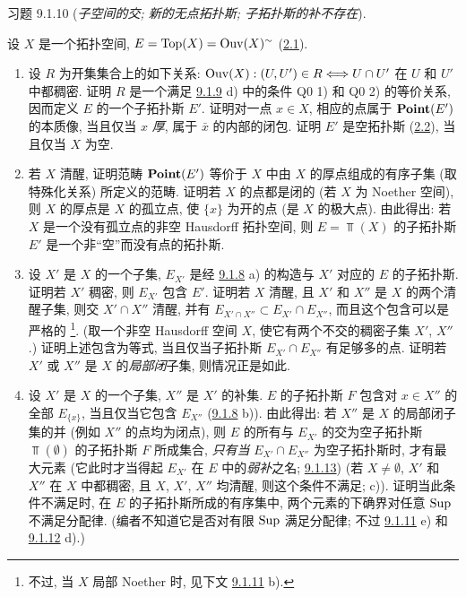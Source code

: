 \begin{enonce*}[remark]{习题 9.1.10}
(\emph{子空间的交; 新的无点拓扑斯; 子拓扑斯的补不存在}).

设 $X$ 是一个拓扑空间,
$E=\operatorname{Top}(X)=\operatorname{Ouv}(X)^{\sim}$ (\hyperref[IV.subsec2.1]{2.1}).

\begin{enumerate}
\renewcommand{\theenumi}{\alph{enumi}}
\renewcommand{\labelenumi}{\theenumi)}
\item 设 $R$ 为开集集合上的如下关系:
$\operatorname{Ouv}(X):(U,U')\in R\Longleftrightarrow U\cap U'$ 在 $U$ 和 $U'$ 中都稠密.
证明 $R$ 是一个满足 \hyperref[IV.exer9.1.9]{9.1.9} d)
中的条件 Q0 1) 和 Q0 2) 的等价关系,
因而定义 $E$ 的一个子拓扑斯 $E'$.
证明对一点 $x\in X$, 相应的点属于 $\operatorname{\mathbf{Point}}(E')$ 的本质像,
当且仅当 $x$ \emph{厚},
\ie 属于 $\bar{x}$ 的内部的闭包.
证明 $E'$ 是空拓扑斯 (\hyperref[IV.subsec2.2]{2.2}), 当且仅当 $X$ 为空.

\item 若 $X$ 清醒,
证明范畴 $\operatorname{\mathbf{Point}}(E')$ 等价于 $X$ 中由 $X$ 的厚点组成的有序子集
(取特殊化关系) 所定义的范畴.
证明若 $X$ 的点都是闭的 (\resp 若 $X$ 为 Noether 空间),
则 $X$ 的厚点是 $X$ 的孤立点,
\ie 使 $\{x\}$ 为开的点 (\resp 是 $X$ 的极大点).
由此得出: 若 $X$ 是\pageoriginale 一个没有孤立点的非空 Hausdorff 拓扑空间,
则 $E=\Top(X)$ 的子拓扑斯 $E'$ 是一个非“空”而没有点的拓扑斯.

\item 设 $X'$ 是 $X$ 的一个子集,
$E_{X'}$ 是经 \hyperref[IV.exer9.1.8]{9.1.8} a)
的构造与 $X'$ 对应的 $E$ 的子拓扑斯.
证明若 $X'$ 稠密, 则 $E_{X'}$ 包含 $E'$.
证明若 $X$ 清醒, 且 $X'$ 和 $X''$ 是 $X$ 的两个清醒子集,
则交 $X'\cap X''$ 清醒,
并有 $E_{X'\cap X''}\subset E_{X'}\cap E_{X''}$,
而且这个包含可以是严格的
\footnote[1]{不过, 当 $X$ 局部 Noether 时, 见下文
\hyperref[IV.exer9.1.11]{9.1.11} b).}.
(取一个非空 Hausdorff 空间 $X$, 使它有两个不交的稠密子集 $X'$, $X''$.)
证明上述包含为等式,
当且仅当子拓扑斯 $E_{X'}\cap E_{X''}$ 有足够多的点.
证明若 $X'$ 或 $X''$ 是 $X$ 的\emph{局部闭}子集, 则情况正是如此.

\item 设 $X'$ 是 $X$ 的一个子集, $X''$ 是 $X'$ 的补集.
$E$ 的子拓扑斯 $F$ 包含对 $x\in X''$ 的全部 $E_{\{x\}}$,
当且仅当它包含 $E_{X''}$
(\cf \hyperref[IV.exer9.1.8]{9.1.8} b)).
由此得出: 若 $X''$ 是 $X$ 的局部闭子集的并
(例如 $X''$ 的点均为闭点),
则 $E$ 的所有与 $E_{X'}$ 的交为空子拓扑斯 $\Top(∅)$ 的子拓扑斯 $F$ 所成集合,
\emph{只有当} $E_{X'}\cap E_{X''}$ 为空子拓扑斯时,
才有最大元素
(它此时才当得起 $E_{X'}$ 在 $E$ 中的\emph{弱补}之名;
\cf \hyperref[IV.exer9.1.13]{9.1.13})
(若 $X\neq∅$, $X'$ 和 $X''$ 在 $X$ 中都稠密,
且 $X$, $X'$, $X''$ 均清醒, 则这个条件不满足; \cf c)).
证明当此条件不满足时,
在 $E$ 的子拓扑斯所成的有序集中,
两个元素的下确界对任意 $\operatorname{Sup}$ 不满足分配律.
(编者不知道它是否对有限 $\operatorname{Sup}$ 满足分配律;
不过 \cf \hyperref[IV.exer9.1.11]{9.1.11} e)
和 \hyperref[IV.exer9.1.12]{9.1.12} d).)
\end{enumerate}
\end{enonce*}

